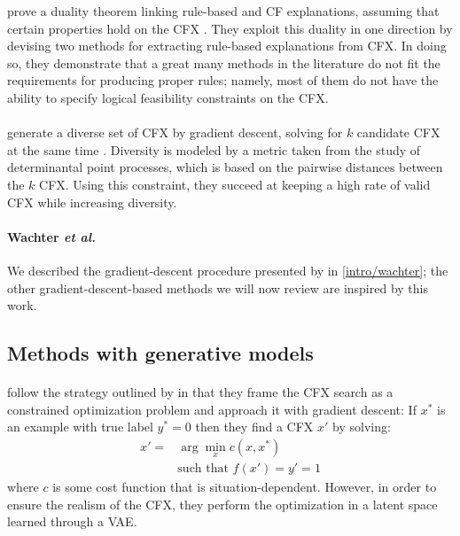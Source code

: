 \documentclass[../main.tex]{subfiles}
\begin{document}
\citeauthor{gengComputing2022} prove a duality theorem linking rule-based and CF explanations, assuming that certain properties hold on the CFX \cite{gengComputing2022}.
They exploit this duality in one direction by devising two methods for extracting rule-based explanations from CFX.
In doing so, they demonstrate that a great many methods in the literature do not fit the requirements for producing proper rules; namely, most of them do not have the ability to specify logical feasibility constraints on the CFX.

\paragraph{}

\citeauthor{mothilalExplaining2020} generate a diverse set of CFX by gradient descent, solving for $k$ candidate CFX at the same time \cite{mothilalExplaining2020}.
Diversity is modeled by a metric taken from the study of determinantal point processes, which is based on the pairwise distances between the $k$ CFX.
Using this constraint, they succeed at keeping a high rate of valid CFX while increasing diversity.

\paragraph{Wachter \textsl{et al.}}

We described the gradient-descent procedure presented by \citeauthor{wachterCounterfactual2017} \cite{wachterCounterfactual2017} in \autoref{intro/wachter};
the other gradient-descent-based methods we will now review are inspired by this work.

\subsection{Methods with generative models}

\paragraph{\revise}
\label{par:revise}

\citeauthor{joshiRealistic2019} follow the strategy outlined by \citeauthor{wachterCounterfactual2017} in that they frame the CFX search as a constrained optimization problem and approach it with gradient descent:
If $x^{*}$ is an example with true label $y^{*} = 0$ then they find a CFX $x'$ by solving:
\begin{align*}
	x' = & \arg\min_{x} c(x, x^{*})              \\
	     & \text{such that } f(x') = y' = 1
\end{align*}
where $c$ is some cost function that is situation-dependent.
However, in order to ensure the realism of the CFX, they perform the optimization in a latent space learned through a VAE.
\end{document}

